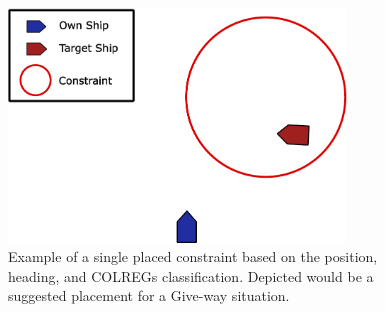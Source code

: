 \begin{figure}[ht]
    \centering
    \includegraphics[width=0.8\textwidth]{Images/Constraint_Example.pdf}
    \caption{Example of a single placed constraint based on the position, heading, and COLREGs classification. Depicted would be a suggested
    placement for a Give-way situation.}
    \label{FIG: Dynamic Constraint Example}
\end{figure}




